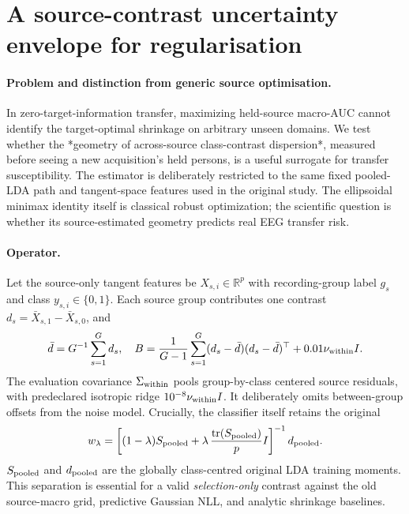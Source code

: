 \section{A source-contrast uncertainty envelope for regularisation}
\label{sec:v31-contrast-envelope}
\paragraph{Problem and distinction from generic source optimisation.}
In zero-target-information transfer, maximizing held-source
macro-AUC cannot identify the target-optimal shrinkage on arbitrary
unseen domains. We test whether the *geometry of across-source
class-contrast dispersion*, measured before seeing a new acquisition's
held persons, is a useful surrogate for transfer susceptibility.
The estimator is deliberately restricted to the same fixed pooled-LDA
path and tangent-space features used in the original study. The
ellipsoidal minimax identity itself is classical robust optimization;
the scientific question is whether its source-estimated geometry
predicts real EEG transfer risk.

\paragraph{Operator.}
Let the source-only tangent features be
$X_{s,i}\in\mathbb R^p$ with recording-group label $g_s$ and class
$y_{s,i}\in\{0,1\}$. Each source group contributes one contrast
$d_s=\bar X_{s,1}-\bar X_{s,0}$, and
\[
 \bar d =G^{-1}\sum_{s=1}^G d_s,\quad
 B={1\over G-1}\sum_{s=1}^G(d_s-\bar d)(d_s-\bar d)^\top
       +0.01 \nu_{\rm within} I.
\]
The evaluation covariance $\Sigma_{\rm within}$ pools
group-by-class centered source residuals, with predeclared isotropic
ridge $10^{-8}\nu_{\rm within}I$. It deliberately omits between-group
offsets from the noise model.
Crucially, the classifier itself retains the original
\[
w_\lambda=\left[(1-\lambda)S_{\rm pooled}
                   +\lambda\,{\mathrm{tr}(S_{\rm pooled})\over p}I
             \right]^{-1}d_{\rm pooled}.
\]
$S_{\rm pooled}$ and $d_{\rm pooled}$ are the globally class-centred
original LDA training moments. This separation is essential for a
valid \emph{selection-only} contrast against the old source-macro
grid, predictive Gaussian NLL, and analytic shrinkage baselines.

